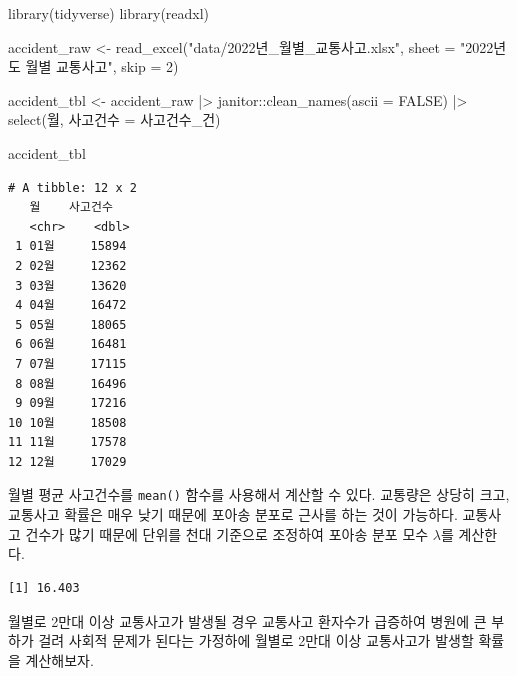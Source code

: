 \documentclass[
  letterpaper,
  chapter,a4paper,showtrims,openright,hidelinks]{oblivoir}
\newenvironment{Shaded}{\begin{snugshade}}{\end{snugshade}}
\newcommand{\AttributeTok}[1]{\textcolor[rgb]{0.40,0.45,0.13}{#1}}
\newcommand{\ConstantTok}[1]{\textcolor[rgb]{0.56,0.35,0.01}{#1}}
\newcommand{\DecValTok}[1]{\textcolor[rgb]{0.68,0.00,0.00}{#1}}
\newcommand{\FunctionTok}[1]{\textcolor[rgb]{0.28,0.35,0.67}{#1}}
\newcommand{\NormalTok}[1]{\textcolor[rgb]{0.00,0.23,0.31}{#1}}
\newcommand{\OtherTok}[1]{\textcolor[rgb]{0.00,0.23,0.31}{#1}}
\newcommand{\SpecialCharTok}[1]{\textcolor[rgb]{0.37,0.37,0.37}{#1}}
\newcommand{\StringTok}[1]{\textcolor[rgb]{0.13,0.47,0.30}{#1}}
\begin{document}
\begin{Shaded}
\begin{Highlighting}[]
\FunctionTok{library}\NormalTok{(tidyverse)}
\FunctionTok{library}\NormalTok{(readxl)}

\NormalTok{accident\_raw }\OtherTok{\textless{}{-}} \FunctionTok{read\_excel}\NormalTok{(}\StringTok{"data/2022년\_월별\_교통사고.xlsx"}\NormalTok{, }\AttributeTok{sheet =} \StringTok{"2022년도 월별 교통사고"}\NormalTok{, }\AttributeTok{skip =} \DecValTok{2}\NormalTok{)}

\NormalTok{accident\_tbl }\OtherTok{\textless{}{-}}\NormalTok{ accident\_raw }\SpecialCharTok{|\textgreater{}} 
\NormalTok{  janitor}\SpecialCharTok{::}\FunctionTok{clean\_names}\NormalTok{(}\AttributeTok{ascii =} \ConstantTok{FALSE}\NormalTok{) }\SpecialCharTok{|\textgreater{}} 
  \FunctionTok{select}\NormalTok{(월, 사고건수 }\OtherTok{=}\NormalTok{ 사고건수\_건) }

\NormalTok{accident\_tbl}
\end{Highlighting}
\end{Shaded}

\begin{verbatim}
# A tibble: 12 x 2
   월    사고건수
   <chr>    <dbl>
 1 01월     15894
 2 02월     12362
 3 03월     13620
 4 04월     16472
 5 05월     18065
 6 06월     16481
 7 07월     17115
 8 08월     16496
 9 09월     17216
10 10월     18508
11 11월     17578
12 12월     17029
\end{verbatim}

월별 평균 사고건수를 \texttt{mean()} 함수를 사용해서 계산할 수 있다.
교통량은 상당히 크고, 교통사고 확률은 매우 낮기 때문에 포아송 분포로
근사를 하는 것이 가능하다. 교통사고 건수가 많기 때문에 단위를 천대
기준으로 조정하여 포아송 분포 모수 \(\lambda\)를 계산한다.

\begin{Shaded}
\end{Shaded}

\begin{verbatim}
[1] 16.403
\end{verbatim}

월별로 2만대 이상 교통사고가 발생될 경우 교통사고 환자수가 급증하여
병원에 큰 부하가 걸려 사회적 문제가 된다는 가정하에 월별로 2만대 이상
교통사고가 발생할 확률을 계산해보자.
\end{document}
